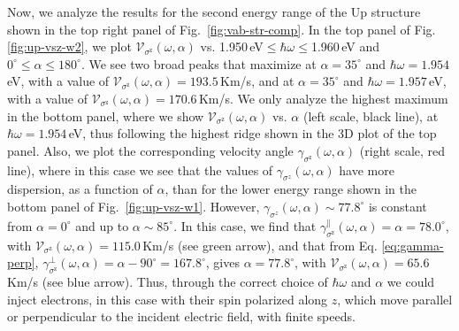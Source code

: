 \documentclass[floatfix,prb,aps,superscriptaddress,showpacs,11pt,preprint,letterpaper]{revtex4}
\begin{document}
Now, we analyze the results for the second energy range of the Up structure
shown in the top right panel of Fig.~\ref{fig:vab-str-comp}. In the top panel of
Fig. \ref{fig:up-vsz-w2}, we plot $\mathcal{V}_{\sigma^{\mathrm{z}}}
(\omega,\alpha)$ vs. 1.950\,eV$\leq\hbar\omega\leq$1.960\,eV and
$0^\circ\leq\alpha\leq 180^\circ$. We see two broad peaks that maximize at
$\alpha=35^{\circ}$ and $\hbar\omega= 1.954$\,eV, with a value of
$\mathcal{V}_{\sigma^{\mathrm{z}}}(\omega,\alpha) = 193.5$\,Km/s, and at
$\alpha=35^{\circ}$ and $\hbar\omega= 1.957$\,eV, with a value of
$\mathcal{V}_{\sigma^{\mathrm{z}}}(\omega,\alpha) = 170.6$\,Km/s. We only
analyze the highest  maximum in the bottom panel, where we  show
$\mathcal{V}_{\sigma^{\mathrm{z}}} (\omega,\alpha)$ vs. $\alpha$ (left scale,
black line), at $\hbar\omega= 1.954$\,eV, thus following the highest ridge shown
in the 3D plot of the top panel. Also, we plot the corresponding velocity angle
$\gamma_{\sigma^\mathrm{z}}(\omega,\alpha)$ (right scale, red line), where in
this case we see that the values of $\gamma_{\sigma^z}(\omega,\alpha)$ have more
dispersion, as a function of $\alpha$, than for the lower energy range shown in
the bottom panel of Fig.~\ref{fig:up-vsz-w1}. However,
$\gamma_{\sigma^z}(\omega,\alpha)\sim 77.8^\circ$ is constant from
$\alpha=0^\circ$ and up to $\alpha\sim 85^\circ$. In this case, we find that
$\gamma^\parallel_{\sigma^\mathrm{z}}(\omega,\alpha)=\alpha=78.0^\circ$, with
$\mathcal{V}_{\sigma^{\mathrm{z}}}(\omega,\alpha) = 115.0$\,Km/s (see green
arrow), and that from Eq. \eqref{eq:gamma-perp},
$\gamma^\perp_{\sigma^\mathrm{z}}(\omega,\alpha)=\alpha-90^\circ=167.8^\circ$,
gives $\alpha=77.8^\circ$, with
$\mathcal{V}_{\sigma^{\mathrm{z}}}(\omega,\alpha) = 65.6$\,Km/s (see blue
arrow). Thus, through the correct choice of $\hbar\omega$ and $\alpha$ we could
inject electrons, in this case with their spin polarized along $z$, which move
parallel or perpendicular to the incident electric field, with finite speeds.
\end{document}
